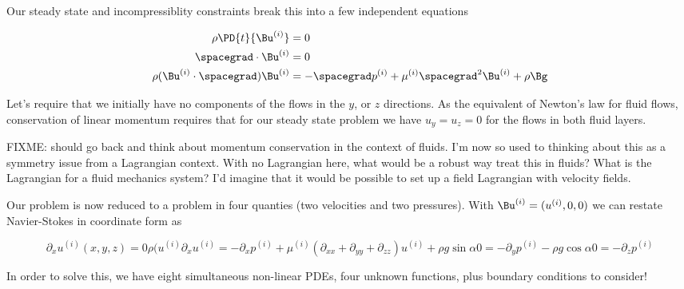 Our steady state and incompressiblity constraints break this into a few independent equations

\begin{align}\label{eqn:twoLayerInclinedFlow:30}
\rho \PD{t}{\Bu^{(i)}} &= 0 \\
\spacegrad \cdot \Bu^{(i)} &= 0 \\
\rho (\Bu^{(i)} \cdot \spacegrad) \Bu^{(i)} &= - \spacegrad p^{(i)} + \mu^{(i)} \spacegrad^2 \Bu^{(i)} + \rho \Bg
\end{align}

Let's require that we initially have no components of the flows in the $y$, or $z$ directions.  As the equivalent of Newton's law for fluid flows, conservation of linear momentum requires that for our steady state problem we have $u_y = u_z = 0$ for the flows in both fluid layers.  

FIXME: should go back and think about momentum conservation in the context of fluids.  I'm now so used to thinking about this as a symmetry issue from a Lagrangian context.  With no Lagrangian here, what would be a robust way treat this in fluids?  What is the Lagrangian for a fluid mechanics system?  I'd imagine that it would be possible to set up a field Lagrangian with velocity fields.

Our problem is now reduced to a problem in four quanties (two velocities and two pressures).  With $\Bu^{(i)} = (u^{(i)}, 0, 0)$ we can restate Navier-Stokes in coordinate form as

\begin{subequations}
\label{eqn:twoLayerInclinedFlow:50}
\begin{equation}\label{eqn:twoLayerInclinedFlow:110}
\partial_x u^{(i)}(x,y,z) = 0
\end{equation}
\begin{equation}\label{eqn:twoLayerInclinedFlow:130}
\rho (u^{(i)} \partial_x u^{(i)} = - \partial_x p^{(i)} + \mu^{(i)} (\partial_{xx} + \partial_{yy} + \partial_{zz}) u^{(i)} + \rho g \sin\alpha 
\end{equation}
\begin{equation}\label{eqn:twoLayerInclinedFlow:150}
0 = - \partial_y p^{(i)} - \rho g \cos\alpha 
\end{equation}
\begin{equation}\label{eqn:twoLayerInclinedFlow:155}
0 = - \partial_z p^{(i)} 
\end{equation}
\end{subequations}

In order to solve this, we have eight simultaneous non-linear PDEs, four unknown functions, plus boundary conditions to consider!

